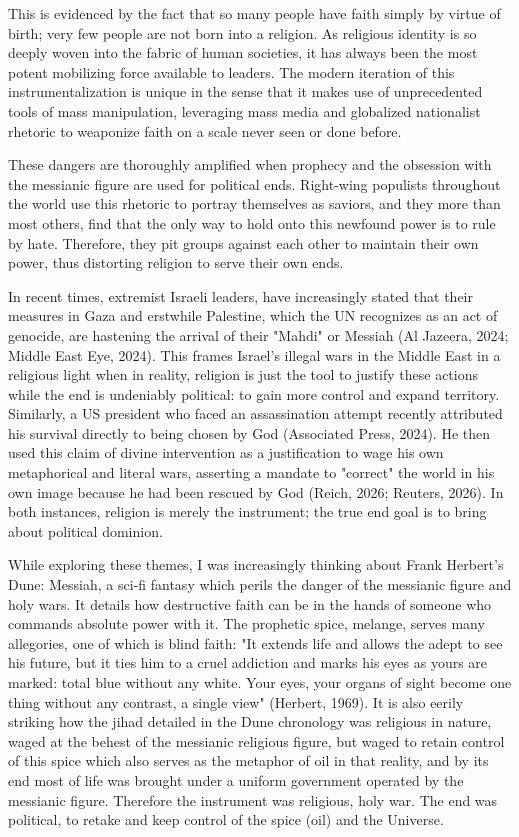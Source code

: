 \documentclass[12pt]{article}
\begin{document}
This is evidenced by the fact that so many people have faith simply by virtue of birth; very few people are not born into a religion. As religious identity is so deeply woven into the fabric of human societies, it has always been the most potent mobilizing force available to leaders. The modern iteration of this instrumentalization is unique in the sense that it makes use of unprecedented tools of mass manipulation, leveraging mass media and globalized nationalist rhetoric to weaponize faith on a scale never seen or done before.

These dangers are thoroughly amplified when prophecy and the obsession with the messianic figure are used for political ends. Right-wing populists throughout the world use this rhetoric to portray themselves as saviors, and they more than most others, find that the only way to hold onto this newfound power is to rule by hate. Therefore, they pit groups against each other to maintain their own power, thus distorting religion to serve their own ends.

\vspace{2em}

In recent times, extremist Israeli leaders, have increasingly stated that their measures in Gaza and erstwhile Palestine, which the UN recognizes as an act of genocide, are hastening the arrival of their "Mahdi" or Messiah (Al Jazeera, 2024; Middle East Eye, 2024). This frames Israel's illegal wars in the Middle East in a religious light when in reality, religion is just the tool to justify these actions while the end is undeniably political: to gain more control and expand territory. Similarly, a US president who faced an assassination attempt recently attributed his survival directly to being chosen by God (Associated Press, 2024). He then used this claim of divine intervention as a justification to wage his own metaphorical and literal wars, asserting a mandate to "correct" the world in his own image because he had been rescued by God (Reich, 2026; Reuters, 2026). In both instances, religion is merely the instrument; the true end goal is to bring about political dominion. 

While exploring these themes, I was increasingly thinking about Frank Herbert's Dune: Messiah, a sci-fi fantasy which perils the danger of the messianic figure and holy wars. It details how destructive faith can be in the hands of someone who commands absolute power with it. The prophetic spice, melange, serves many allegories, one of which is blind faith: "It extends life and allows the adept to see his future, but it ties him to a cruel addiction and marks his eyes as yours are marked: total blue without any white. Your eyes, your organs of sight become one thing without any contrast, a single view" (Herbert, 1969). It is also eerily striking how the jihad detailed in the Dune chronology was religious in nature, waged at the behest of the messianic religious figure, but waged to retain control of this spice which also serves as the metaphor of oil in that reality, and by its end most of life was brought under a uniform government operated by the messianic figure. Therefore the instrument was religious, holy war. The end was political, to retake and keep control of the spice (oil) and the Universe.
\end{document}
